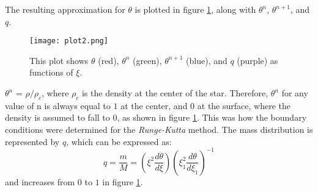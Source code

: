 \documentclass[12pt]{article}
\begin{document}
The resulting approximation for $\theta$ is plotted in figure
\ref{plot}, along with $\theta^n$, $\theta^{n+1}$, and $q$.
\begin{figure}[h]
\centering
\texttt{[image: plot2.png]}
\caption{This plot shows $\theta$ (red), 
$\theta^n$ (green),
$\theta^{n+1}$ (blue),
and $q$ (purple) 
as functions of $\xi$.} 
\label{plot}
\end{figure}
$\theta^n$ = $\rho/\rho_c$, where $\rho_c$ is the density at the center 
of the star. Therefore, $\theta^n$ for any value of n is always equal
to $1$ at the center, and $0$ at the surface, where the density is assumed
 to fall to $0$, as shown in figure \ref{plot}. This was how the boundary 
 conditions were determined for the \emph{Runge-Kutta} method. The mass 
 distribution is represented by $q$, which can be expressed as:
\begin{equation}
 q = \frac{m}{M} = \left(\xi^2\frac{d\theta}{d\xi}\right)
                   \left(\xi^{2}_{1}\frac{d\theta}{d\xi_1}\right)^{-1}
\end{equation}
and increases from $0$ to $1$ in figure \ref{plot}.

\newpage

\end{document}
